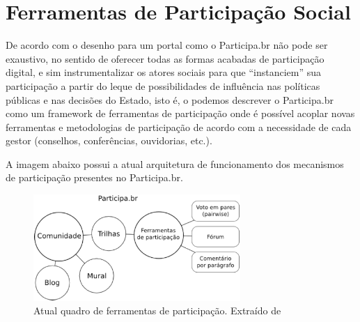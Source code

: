 \section{Ferramentas de Participação Social}

De acordo com \cite{solagna2014metodologias} o desenho para um portal como o Participa.br não pode ser exaustivo, no sentido de oferecer todas as formas acabadas de participação digital, e sim instrumentalizar os atores sociais para que “instanciem” sua participação a partir do leque de possibilidades de influência nas políticas públicas e nas decisões do Estado, isto é, o podemos descrever o Participa.br como um framework de ferramentas de participação onde é possível acoplar novas ferramentas e metodologias de participação de acordo com a necessidade de cada gestor (conselhos, conferências, ouvidorias, etc.).

A imagem abaixo possui a atual arquitetura de funcionamento dos mecanismos de participação presentes no Participa.br. 

\graphicspath{{figuras/}}
\begin{figure}[H]
\centering
\includegraphics[width=0.7\textwidth]{arquitetura-ferramentas-participa}
\caption{Atual quadro de ferramentas de participação. Extraído de \cite{solagna2014metodologias}}
\label{fig:arquiteturaparticipa}
\end{figure}
















